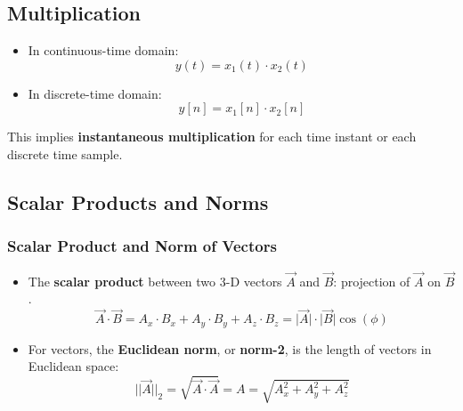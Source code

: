 \subsection{Multiplication} 
\begin{itemize}
\item In continuous-time domain: 
\[ y(t) = x_{1}(t) \cdot x_{2}(t) \]
\item In discrete-time domain:
\[ y[n] = x_{1}[n] \cdot x_{2}[n] \]
\end{itemize}
This implies \textbf{instantaneous multiplication} for each time instant or each discrete time sample.
\subsection{Scalar Products and Norms}
\subsubsection{Scalar Product and Norm of Vectors}
\begin{itemize}
\item The \textbf{scalar product} between two 3-D vectors $\vec{A}$ and $\vec{B}$: projection of $\vec{A}$ on $\vec{B}$.
\[ \vec{A} \cdot \vec{B} = A_{x} \cdot B_{x} + A_{y} \cdot B_{y} + A_{z} \cdot B_{z} = \lvert \vec{A} \rvert \cdot \lvert \vec{B} \lvert \cos(\phi) \]
 \item For vectors, the \textbf{Euclidean norm}, or \textbf{norm-2}, is the length of vectors in Euclidean space:
 \[ \lvert \lvert \vec{A} \rvert \rvert_{2} = \sqrt{\vec{A} \cdot \vec{A}} = A = \sqrt{A_{x}^2+A_{y}^2+A_{z}^2} \]
 \end{itemize}
